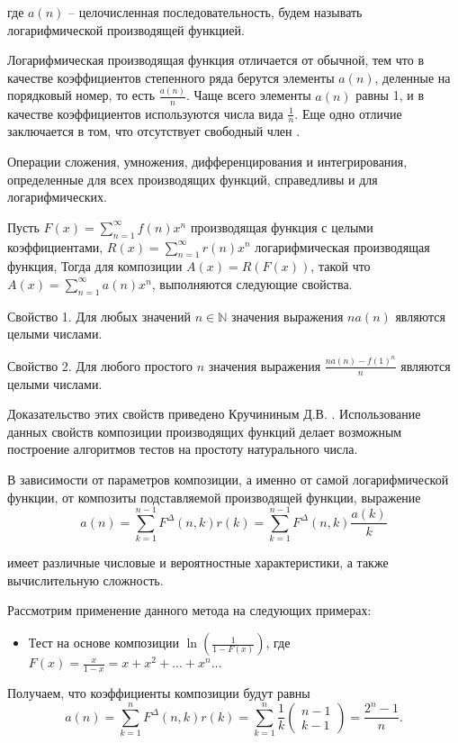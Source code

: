 \documentclass[
russian,
cp1251,
14pt,
simple
]{eskdtext}
\theoremstyle{definition}
\begin{document}
где $a(n)$ -- целочисленная последовательность, будем называть логарифмической производящей функцией.

Логарифмическая производящая функция отличается от обычной, тем что в качестве коэффициентов степенного ряда берутся элементы $a(n) $, деленные на порядковый номер, то есть $\frac{a(n)}{n} $. Чаще всего элементы $a(n) $ равны 1, и в качестве коэффициентов используются числа вида $\frac{1}{n}$.  Еще одно отличие заключается в том, что отсутствует свободный член \cite{KruchininDV_SPofLGF}.

Операции сложения, умножения, дифференцирования и интегрирования, определенные для всех производящих функций, справедливы и для логарифмических.

Пусть $F(x)=\sum\limits _{n = 1}^{\infty}f(n)x^n$ производящая функция с целыми коэффициентами, $R(x)=\sum\limits _{n = 1}^{\infty}r(n)x^n$ логарифмическая производящая функция, Тогда для композиции $A(x)=R(F(x))$, такой что $A(x)=\sum\limits _{n = 1}^{\infty}a(n)x^n$, выполняются следующие свойства.

Свойство 1. Для любых значений $n \in \mathbb{N} $ значения выражения $na(n)$ являются целыми числами.
 
Свойство 2. Для любого простого $n$ значения выражения $\frac{na(n) - f(1)^n}{n}$ являются целыми числами.

Доказательство этих свойств приведено Кручининым Д.В. \cite{KruchininDV_SPofLGF}. 
Использование данных свойств композиции производящих функций делает возможным построение алгоритмов тестов на простоту натурального числа.

В зависимости от параметров композиции, а именно от самой логарифмической функции, от композиты подставляемой производящей функции, выражение
$$
a(n)=\sum\limits _{k=1}^{n-1}F^{\Delta } (n,k)r(k) =\sum\limits _{k=1}^{n-1}F^{\Delta } (n,k)\frac{a(k)}{k}   
$$

имеет различные числовые и вероятностные характеристики, а также вычислительную сложность.

Рассмотрим применение данного метода на следующих примерах:

\begin{itemize}
\item Тест на основе композиции $\ln(\frac{1}{1-F(x)} )$, где $F(x)=\frac{x}{1-x} =x+x^{2} +...+x^{n}\ldots$
\end{itemize}

Получаем, что коэффициенты композиции будут равны
$$
a(n)=\sum\limits _{k=1}^{n}F^{\Delta } (n,k)r(k) =\sum\limits _{k=1}^{n}\frac{1}{k}  \left(\begin{array}{c} {n-1} \\ {k-1} \end{array}\right)=\frac{2^{n} -1}{n} . 
$$
\end{document}
